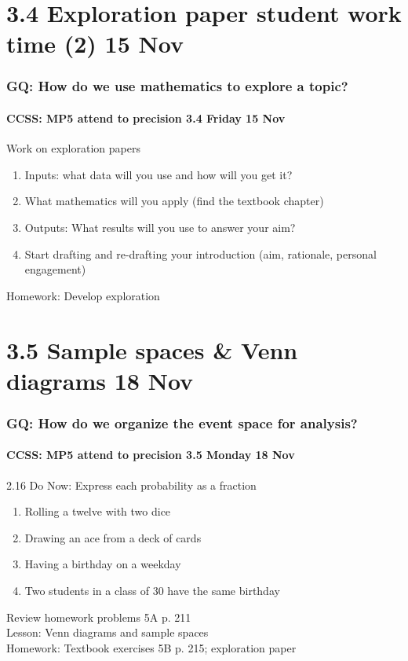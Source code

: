 \documentclass{beamer}
\begin{document}
\section{3.4 Exploration paper student work time (2) 15 Nov}
\frame
{
  \frametitle{GQ: How do we use mathematics to explore a topic?}
  \framesubtitle{CCSS: MP5 attend to precision \hfill \alert{3.4 Friday 15 Nov}}

  \begin{block}{Work on exploration papers}
  \begin{enumerate}
      \item Inputs: what data will you use and how will you get it? 
      \item What mathematics will you apply (find the textbook chapter)
      \item Outputs: What results will you use to answer your aim?
      \item Start drafting and re-drafting your introduction (aim, rationale, personal engagement)
  \end{enumerate}
  \end{block}
  Homework: Develop exploration 
}

\section{3.5 Sample spaces \& Venn diagrams 18 Nov}
\frame
{
  \frametitle{GQ: How do we organize the event space for analysis?}
  \framesubtitle{CCSS: MP5 attend to precision \hfill \alert{3.5 Monday 18 Nov}}

  \begin{block}{2.16 Do Now: Express each probability as a fraction}
  \begin{enumerate}
      \item Rolling a twelve with two dice
      \item Drawing an ace from a deck of cards
      \item Having a birthday on a weekday
      \item Two students in a class of 30 have the same birthday
  \end{enumerate}
  \end{block}
  Review homework problems 5A p. 211 \\
  Lesson: Venn diagrams and sample spaces \\ \smallskip
  Homework: Textbook exercises 5B p. 215; exploration paper
}
\end{document}
